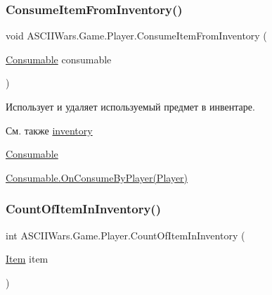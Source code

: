 \hypertarget{class_a_s_c_i_i_wars_1_1_game_1_1_player_ac1b40c126e1d9ec4f45f7831a86497ba}{}\label{class_a_s_c_i_i_wars_1_1_game_1_1_player_ac1b40c126e1d9ec4f45f7831a86497ba} 
\subsubsection{\texorpdfstring{Consume\+Item\+From\+Inventory()}{ConsumeItemFromInventory()}}
{\footnotesize\ttfamily void A\+S\+C\+I\+I\+Wars.\+Game.\+Player.\+Consume\+Item\+From\+Inventory (\begin{DoxyParamCaption}\item[{\hyperlink{class_a_s_c_i_i_wars_1_1_game_1_1_consumable}{Consumable}}]{consumable }\end{DoxyParamCaption})\hspace{0.3cm}{\ttfamily [inline]}}



Использует и удаляет используемый предмет в инвентаре. 

\begin{DoxySeeAlso}{См. также}
\hyperlink{class_a_s_c_i_i_wars_1_1_game_1_1_player_a04acfaa196162f89bfae7aee5ec45480}{inventory} 

\hyperlink{class_a_s_c_i_i_wars_1_1_game_1_1_consumable}{Consumable} 

\hyperlink{class_a_s_c_i_i_wars_1_1_game_1_1_consumable_a6aac67fe076ca39cb850e3720461fff8}{Consumable.\+On\+Consume\+By\+Player(\+Player)} 
\end{DoxySeeAlso}
\hypertarget{class_a_s_c_i_i_wars_1_1_game_1_1_player_acb07b9e02dfe26cae85c1b685517438b}{}\label{class_a_s_c_i_i_wars_1_1_game_1_1_player_acb07b9e02dfe26cae85c1b685517438b} 
\subsubsection{\texorpdfstring{Count\+Of\+Item\+In\+Inventory()}{CountOfItemInInventory()}}
{\footnotesize\ttfamily int A\+S\+C\+I\+I\+Wars.\+Game.\+Player.\+Count\+Of\+Item\+In\+Inventory (\begin{DoxyParamCaption}\item[{\hyperlink{class_a_s_c_i_i_wars_1_1_game_1_1_item}{Item}}]{item }\end{DoxyParamCaption})\hspace{0.3cm}{\ttfamily [inline]}}



